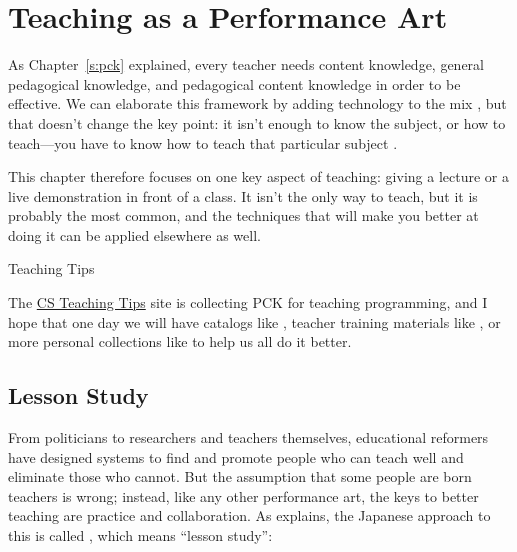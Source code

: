 \chapter{Teaching as a Performance Art}\label{s:performance}

As Chapter~\ref{s:pck} explained, every teacher needs content knowledge,
general pedagogical knowledge, and pedagogical content knowledge in
order to be effective. We can elaborate this framework by adding
technology to the mix \cite{Koeh2013}, but that doesn't change the
key point: it isn't enough to know the subject, or how to teach---you have
to know how to teach that particular subject \cite{Maye2004}.

This chapter therefore focuses on one key aspect of teaching: giving a
lecture or a live demonstration in front of a class. It isn't the only
way to teach, but it is probably the most common, and the techniques
that will make you better at doing it can be applied elsewhere as well.

\begin{aside}{Teaching Tips}

The \href{http://csteachingtips.org/}{CS Teaching Tips} site is collecting PCK for
teaching programming, and I hope that one day we will have catalogs
like \cite{Ojos2015}, teacher training materials like
\cite{Hazz2014,Guzd2015a,Sent2018}, or more
personal collections like \cite{Gelm2002} to help us all do it
better.

\end{aside}

\section{Lesson Study}\label{s:performance-jugyokenkyu}

From politicians to researchers and teachers themselves, educational
reformers have designed systems to find and promote people who can teach
well and eliminate those who cannot. But the assumption that some people
are born teachers is wrong; instead, like any other performance art, the
keys to better teaching are practice and collaboration. As
\cite{Gree2014} explains, the Japanese approach to this is called
, which means ``lesson study'':

